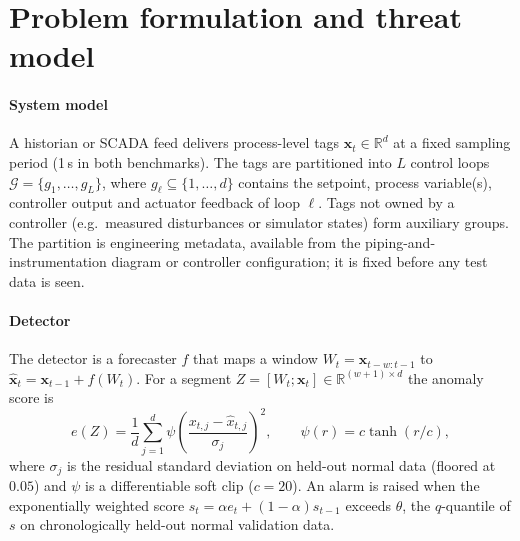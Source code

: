 \section{Problem formulation and threat model}\label{sec:problem}

\paragraph{System model}
A historian or SCADA feed delivers process-level tags $\bm x_t\in\mathbb R^d$ at a fixed sampling period (1\,s in both benchmarks). The tags are partitioned into $L$ control loops $\mathcal G=\{g_1,\dots,g_L\}$, where $g_\ell\subseteq\{1,\dots,d\}$ contains the setpoint, process variable(s), controller output and actuator feedback of loop $\ell$. Tags not owned by a controller (e.g.\ measured disturbances or simulator states) form auxiliary groups. The partition is engineering metadata, available from the piping-and-instrumentation diagram or controller configuration; it is fixed before any test data is seen.

\paragraph{Detector} The detector is a forecaster $f$ that maps a window $W_t=\bm x_{t-w:t-1}$ to $\hat{\bm x}_t=\bm x_{t-1}+f(W_t)$. For a segment $Z=[W_t;\bm x_t]\in\mathbb R^{(w+1)\times d}$ the anomaly score is
\begin{equation}\label{eq:score}
e(Z)=\frac1d\sum_{j=1}^{d}\psi\!\left(\frac{x_{t,j}-\hat x_{t,j}}{\sigma_j}\right)^{2},\qquad \psi(r)=c\tanh(r/c),
\end{equation}
where $\sigma_j$ is the residual standard deviation on held-out normal data (floored at $0.05$) and $\psi$ is a differentiable soft clip ($c=20$). An alarm is raised when the exponentially weighted score $s_t=\alpha e_t+(1-\alpha)s_{t-1}$ exceeds $\theta$, the $q$-quantile of $s$ on chronologically held-out normal validation data.

